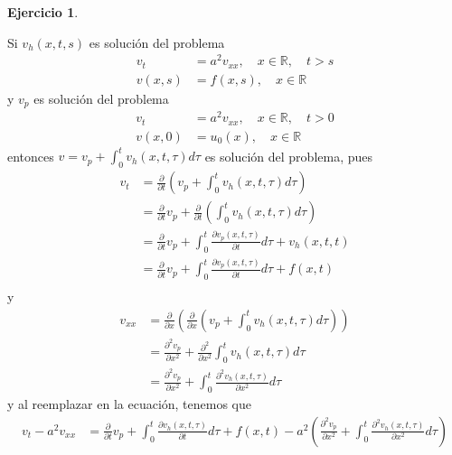 \documentclass{article}
\theoremstyle{plain}
\theoremstyle{definition}
\newtheorem{ex}[proposición]{Ejercicio}
\begin{document}
\begin{ex}
\begin{enumerate}
            Si \(v_{h}(x,t,s)\) es solución del problema
            \begin{align*}
                v_t &= a^2 v_{xx}, \quad x \in \mathbb{R}, \quad t > s\\
                v(x, s) &= f(x,s), \quad x \in \mathbb{R}
            \end{align*}
            y \(v_{p}\) es solución del problema
            \begin{align*}
                v_t &= a^2 v_{xx}, \quad x \in \mathbb{R}, \quad t > 0\\
                v(x, 0) &= u_0(x), \quad x \in \mathbb{R}
            \end{align*}
            entonces \(v = v_{p} + \int_0^t v_{h}(x, t, \tau) d\tau\) es solución del problema, pues
            \begin{align*}
                v_t &= \frac{\partial}{\partial t} \left( v_{p} + \int_0^t v_{h}(x,t, \tau) d\tau \right) \\
                &= \frac{\partial}{\partial t} v_{p} + \frac{\partial}{\partial t} \left( \int_0^t v_{h}(x,t, \tau) d\tau \right) \\
                &= \frac{\partial}{\partial t} v_{p} + \int_0^t \frac{\partial v_p(x,t,\tau)}{\partial t} d\tau + v_{h}(x,t,t) \\
                &= \frac{\partial}{\partial t} v_{p} + \int_0^t \frac{\partial v_p(x,t,\tau)}{\partial t} d\tau + f(x,t) \\
            \end{align*}
            y
            \begin{align*}
                v_{xx} &= \frac{\partial}{\partial x} (\frac{\partial}{\partial x} (v_{p} + \int_0^t v_{h}(x,t, \tau) d\tau)) \\
                &= \frac{\partial^2 v_{p}}{\partial x^2} + \frac{\partial^2}{\partial x^2} \int_0^t v_{h}(x,t, \tau) d\tau \\
                &= \frac{\partial^2 v_{p}}{\partial x^2} + \int_0^t \frac{\partial^2 v_{h}(x,t, \tau)}{\partial x^2} d\tau
            \end{align*}
            y al reemplazar en la ecuación, tenemos que
            \begin{align*}
                v_t - a^2 v_{xx} &= \frac{\partial}{\partial t} v_{p} + \int_0^t \frac{\partial v_h(x,t,\tau)}{\partial t} d\tau + f(x,t) - a^2 \left( \frac{\partial^2 v_{p}}{\partial x^2} + \int_0^t \frac{\partial^2 v_{h}(x,t, \tau)}{\partial x^2} d\tau \right) \\

\end{align*}
\end{enumerate}
\end{ex}
\end{document}
